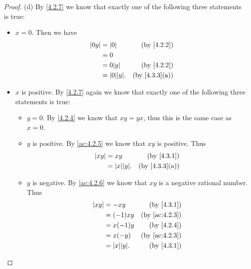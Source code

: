 \begin{proof}{(d)}
  By \cref{4.2.7} we know that exactly one of the following three statements is true:
  \begin{itemize}
    \item \(x = 0\).
          Then we have
          \begin{align*}
            \abs{0y} & = \abs{0}          & \text{(by \cref{4.2.2})}    \\
                     & = 0                                              \\
                     & = 0 \abs{y}        & \text{(by \cref{4.2.2})}    \\
                     & = \abs{0} \abs{y}. & \text{(by \cref{4.3.3}(a))}
          \end{align*}
    \item \(x\) is positive.
          By \cref{4.2.7} again we know that exactly one of the following three statements is true:
          \begin{itemize}
            \item \(y = 0\).
                  By \cref{4.2.4} we know that \(xy = yx\), thus this is the same case as \(x = 0\).
            \item \(y\) is positive.
                  By \cref{ac:4.2.5} we know that \(xy\) is positive.
                  Thus
                  \begin{align*}
                    \abs{xy} & = xy               & \text{(by \cref{4.3.1})}    \\
                             & = \abs{x} \abs{y}. & \text{(by \cref{4.3.3}(a))}
                  \end{align*}
            \item \(y\) is negative.
                  By \cref{ac:4.2.6} we know that \(xy\) is a negative rational number.
                  Thus
                  \begin{align*}
                    \abs{xy} & = -xy              & \text{(by \cref{4.3.1})}    \\
                             & = (-1)xy           & \text{(by \cref{ac:4.2.3})} \\
                             & = x(-1)y           & \text{(by \cref{4.2.4})}    \\
                             & = x(-y)            & \text{(by \cref{ac:4.2.3})} \\
                             & = \abs{x} \abs{y}. & \text{(by \cref{4.3.1})}    \\

\end{align*}
\end{itemize}
\end{itemize}
\end{proof}
